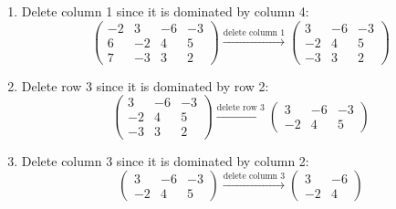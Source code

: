 \documentclass[11pt]{article}
\begin{document}
\begin{enumerate}[1)]
\begin{solution}
\begin{enumerate}[1.]
\begin{equation*}
\begin{pmatrix}
    7 & -3 & 3 & 2 
  \end{pmatrix} \xrightarrow{\text{delete row 2}}
  \begin{pmatrix}
    -2 & 3 & -6 & -3 \\
    6 & -2 & 4 & 5 \\
    7 & -3 & 3 & 2 
  \end{pmatrix}
  \end{equation*}
  \item Delete column 1 since it is dominated by column 4:
  \begin{equation*}
  \begin{pmatrix}
    -2 & 3 & -6 & -3 \\
    6 & -2 & 4 & 5 \\
    7 & -3 & 3 & 2 
  \end{pmatrix} \xrightarrow{\text{delete column 1}}
  \begin{pmatrix}
    3 & -6 & -3 \\
    -2 & 4 & 5 \\
    -3 & 3 & 2 
  \end{pmatrix}
  \end{equation*}
  \item Delete row 3 since it is dominated by row 2:
  \begin{equation*}
  \begin{pmatrix}
    3 & -6 & -3 \\
    -2 & 4 & 5 \\
    -3 & 3 & 2 
  \end{pmatrix} \xrightarrow{\text{delete row 3}}
  \begin{pmatrix}
    3 & -6 & -3 \\
    -2 & 4 & 5 
  \end{pmatrix}
  \end{equation*}
  \item Delete column 3 since it is dominated by column 2:
  \begin{equation*}
  \begin{pmatrix}
    3 & -6 & -3 \\
    -2 & 4 & 5 
  \end{pmatrix} \xrightarrow{\text{delete column 3}}
  \begin{pmatrix}
    3 & -6 \\
    -2 & 4 
  \end{pmatrix}
  \end{equation*}
\end{enumerate}
\end{solution}



\end{enumerate}
\end{document}
